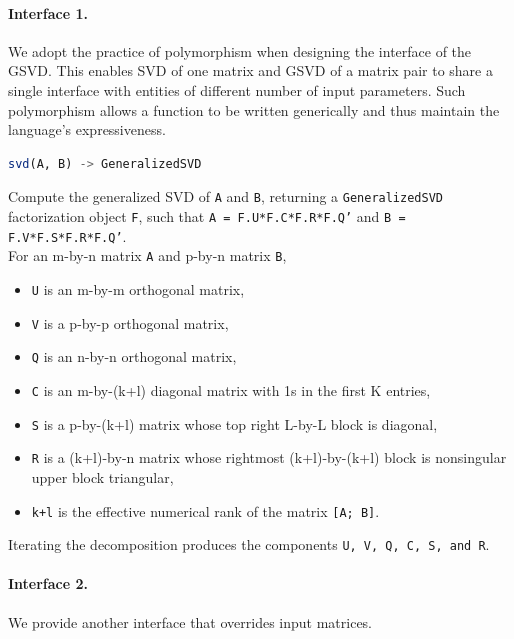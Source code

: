 \paragraph{Interface 1.} We adopt the practice of polymorphism when designing the interface of the GSVD. This enables SVD of one matrix and GSVD of a matrix pair to share a single interface with entities of different number of input parameters. Such polymorphism allows a function to be written generically and thus maintain the language's expressiveness. 

\newpage

\begin{lstlisting}[language=julia, style=jlcodestyle]
svd(A, B) -> GeneralizedSVD
\end{lstlisting}

Compute the generalized SVD of \texttt{A} and \texttt{B}, returning a \texttt{GeneralizedSVD} factorization object \texttt{F}, such that \texttt{A = F.U*F.C*F.R*F.Q'} and \texttt{B = F.V*F.S*F.R*F.Q'}. \\

For an m-by-n matrix \texttt{A} and p-by-n matrix \texttt{B},

    \begin{itemize}
        \item \texttt{U} is an m-by-m orthogonal matrix,
        \item \texttt{V} is a p-by-p orthogonal matrix,
        \item \texttt{Q} is an n-by-n orthogonal matrix,
        \item \texttt{C} is an m-by-(k+l) diagonal matrix with 1s in the first K entries,
        \item \texttt{S} is a p-by-(k+l) matrix whose top right L-by-L block is diagonal,
        \item \texttt{R} is a (k+l)-by-n matrix whose rightmost (k+l)-by-(k+l) block is nonsingular upper block triangular,
        \item \texttt{k+l} is the effective numerical rank of the matrix \texttt{[A; B]}.
    \end{itemize}
    
Iterating the decomposition produces the components \texttt{U, V, Q, C, S, and R}. 

\paragraph{Interface 2.} We provide another interface that overrides input matrices. 

